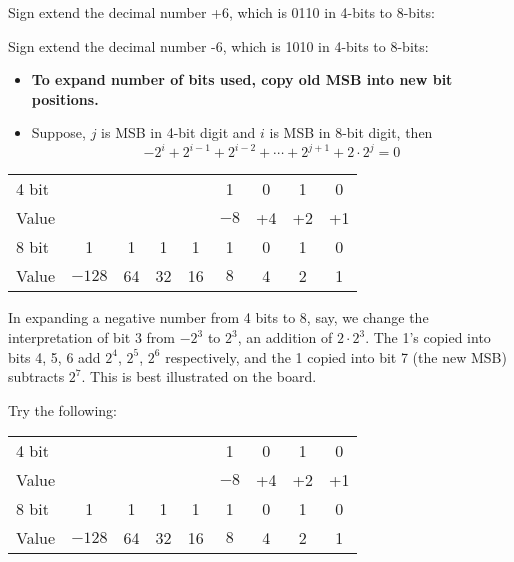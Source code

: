\begin{frame}[fragile]
\begin{tcolorbox}[enhanced,attach boxed title to top center={yshift=-3mm,yshifttext=-1mm},
  colback=red!5!white,colframe=red!75!black,colbacktitle=red!80!black,
  title=Try this,fonttitle=\bfseries,
  boxed title style={size=small,colframe=red!50!black} ]
  Sign extend the decimal number +6, which is 0110 in 4-bits to 8-bits: \ifnum{}\fi
  \end{tcolorbox}
\begin{tcolorbox}[enhanced,attach boxed title to top center={yshift=-3mm,yshifttext=-1mm},
  colback=red!5!white,colframe=red!75!black,colbacktitle=red!80!black,
  title=Try this,fonttitle=\bfseries,
  boxed title style={size=small,colframe=red!50!black} ]
  Sign extend the decimal number -6, which is 1010 in 4-bits to 8-bits: \ifnum{}\fi
  \end{tcolorbox}
  \begin{itemize}
\item  \textbf{To expand number of bits used, copy old MSB into new bit positions.} 
\item Suppose, $j$ is MSB in 4-bit digit and $i$ is MSB in 8-bit digit, then  
\[
-2^i + 2^{i-1} + 2^{i-2} + \cdots + 2^{j+1} +
2 \cdot 2^j = 0
\]
\end{itemize}
{\footnotesize
\begin{tabular}{lcccccccc}
4 bit &   &   &   &   &  1 & 0 & 1 & 0\\
Value &   &   &   &   &  $-8$ & +4 & +2 & +1\\
\hline
8 bit & 1 & 1 & 1 & 1 &  1 & 0 & 1 & 0\\
Value &$-128$& 64& 32& 16&  $8$ & 4 & 2 & 1\\
\end{tabular}}
\BNotes\ifnum{}
In expanding a negative number from 4 bits to 8, say, we change the
interpretation of bit 3 from $-2^3$ to $2^3$, an addition of $2 \cdot
2^3$. The 1's copied into bits 4, 5, 6 add $2^4$, $2^5$,
$2^6$ respectively, and the 1 copied into bit 7 (the new MSB)
subtracts $2^7$. This is best illustrated on the board.

Try the following:

\begin{tabular}{lcccccccc}
4 bit &   &   &   &   &  1 & 0 & 1 & 0\\
Value &   &   &   &   &  $-8$ & +4 & +2 & +1\\
\hline
8 bit & 1 & 1 & 1 & 1 &  1 & 0 & 1 & 0\\
Value &$-128$& 64& 32& 16&  $8$ & 4 & 2 & 1\\
\end{tabular}


\end{frame}
